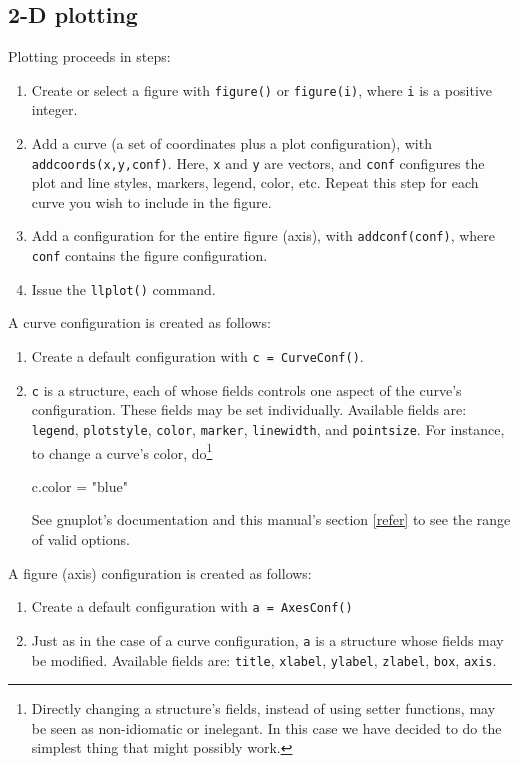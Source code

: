 \documentclass[11pt]{article}
\newcommand{\cmd}[1]{\texttt{#1}}
\begin{document}
\subsection{2-D plotting}

Plotting proceeds in steps:
\begin{enumerate}
	\item Create or select a figure with \cmd{figure()} or \cmd{figure(i)},
		where \cmd{i} is a positive integer.
	\item Add a curve (a set of coordinates plus a plot configuration), with
		\cmd{addcoords(x,y,conf)}. Here, \cmd{x} and \cmd{y} are vectors, and
		\cmd{conf} configures the plot and line styles, markers, legend, color,
		etc. Repeat this step for each curve you wish to include
		in the figure.
	\item Add a configuration for the entire figure (axis), with
		\cmd{addconf(conf)}, where \cmd{conf} contains the figure
		configuration.
	\item Issue the \cmd{llplot()} command.
\end{enumerate}

A curve configuration is created as follows:
\begin{enumerate}
	\item Create a default configuration with \cmd{c = CurveConf()}.
	\item \cmd{c} is a structure, each of whose fields controls one aspect of
		the curve's configuration. These fields may be set individually.
		Available fields are: \cmd{legend}, \cmd{plotstyle}, \cmd{color},
		\cmd{marker}, \cmd{linewidth}, and \cmd{pointsize}. For instance, to
		change a curve's color, do\footnote{Directly changing a structure's
		fields, instead of using setter functions, may be seen as non-idiomatic
		or inelegant. In this case we have decided to do the simplest thing
		that might possibly work.}

\begin{juliacode}
c.color = "blue"
\end{juliacode}

See gnuplot's documentation and this manual's section \ref{refer} to see the
range of valid options.

\end{enumerate}

A figure (axis) configuration is created as follows:
\begin{enumerate}
	\item Create a default configuration with \cmd{a = AxesConf()}
	\item Just as in the case of a curve configuration, \cmd{a} is a structure
		whose fields may be modified. Available fields are: \cmd{title},
		\cmd{xlabel}, \cmd{ylabel}, \cmd{zlabel}, \cmd{box}, \cmd{axis}.
\end{enumerate}
\end{document}
